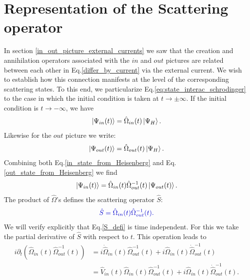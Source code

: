 \documentclass[
11pt, %
english, %
singlespacing, %
headsepline, %
]{MastersDoctoralThesis} %
\begin{document}
\section{Representation of the Scattering operator}\label{Connections}
In section \ref{in_out_picture_external_currents} we saw that the creation and annihilation operators associated with the $ in $ and $ out $ pictures are related between each other in Eq.\enskip\eqref{differ_by_current} via the external current. 
We wish to establish how this connection manifests at the level of the corresponding scattering states. To this end, we particularize Eq.\enskip\eqref{eq:state_interac_schrodinger} to the case in which the initial condition is taken at $ t \rightarrow \pm \infty $.
If the initial condition is $ t \rightarrow - \infty $, we have
\begin{equation}\label{in_state_from_Heisenberg}
\ket{\Psi_{in}(t)}=\hat{\Omega}_{in}(t)\ket{\Psi_{H}}.
\end{equation}
Likewise for the $ out $ picture we write:
\begin{equation}\label{out_state_from_Heisenberg}
\ket{\Psi_{out}(t)}=\hat{\Omega}_{out}(t)\ket{\Psi_{H}}.
\end{equation}
Combining both Eq.\enskip\eqref{in_state_from_Heisenberg} and Eq.\enskip\eqref{out_state_from_Heisenberg} we find
\begin{equation}\label{in_to_out_state}
\ket{\Psi_{in}(t)}=\hat{\Omega}_{in}(t)\hat{\Omega}^{-1}_{out}(t)\ket{\Psi_{out}(t)}.
\end{equation}
The product of $ \hat{\Omega} $'s defines the scattering operator $ \hat{S} $:%
\begin{equation}\label{S_defi}
\textcolor[RGB]{0,0,204}{
	\hat{S}=
	\hat{\Omega}_{in}(t)\hat{\Omega}^{-1}_{out}(t)
	.
}
\end{equation}
We will verify explicitly that Eq.\enskip\eqref{S_defi} is  time independent. For this we take the partial derivative of $ \hat{S} $ with respect to $ t $. This operation leads to
\begin{equation}\label{partial_t_for_indepen}
\begin{split}
i\partial_{t}
\left( \hat{\Omega}_{in}(t)\hat{\Omega}^{-1}_{out}(t) \right)
&= i\dot{\hat{\Omega}}_{in}(t)\hat{\Omega}^{-1}_{out}(t)
 	+ 
 		i\hat{\Omega}_{in}(t)\dot{\hat{\Omega}}^{-1}_{out}(t)
\\
&= \hat{V}_{in}(t)\hat{\Omega}_{in}(t)\hat{\Omega}^{-1}_{out}(t)
	+ 	
		i\hat{\Omega}_{in}(t)\dot{\hat{\Omega}}^{-1}_{out}(t)
.
\end{split}
\end{equation}
\end{document}
